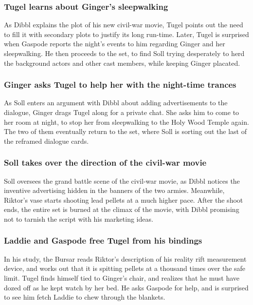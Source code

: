 \subsubsection{\Gls{Tugel} learns about \Gls{Ginger}'s sleepwalking}
As \Gls{Dibbl} explains the plot of his new civil-war movie, \Gls{Tugel} points out the need to
fill it with secondary plots to justify its long run-time. Later, \Gls{Tugel} is surprised when
\Gls{Gaspode} reports the night's events to him regarding \Gls{Ginger} and her sleepwalking. He
then proceeds to the set, to find \Gls{Soll} trying desperately to herd the background actors and
other cast members, while keeping \Gls{Ginger} placated.

\subsubsection{\Gls{Ginger} asks \Gls{Tugel} to help her with the night-time trances}
As \Gls{Soll} enters an argument with \Gls{Dibbl} about adding advertisements to the dialogue,
\Gls{Ginger} drags \Gls{Tugel} along for a private chat. She asks him to come to her room at night,
to stop her from sleepwalking to the Holy Wood Temple again. The two of them eventually return to
the set, where \Gls{Soll} is sorting out the last of the reframed dialogue cards.

\subsubsection{\Gls{Soll} takes over the direction of the civil-war movie}
\Gls{Soll} oversees the grand battle scene of the civil-war movie, as \Gls{Dibbl} notices the
inventive advertising hidden in the banners of the two armies. Meanwhile, \Gls{Riktor}'s vase starts
shooting lead pellets at a much higher pace. After the shoot ends, the entire set is burned at the
climax of the movie, with \Gls{Dibbl} promising not to tarnish the script with his marketing ideas.

\subsubsection{\Gls{Laddie} and \Gls{Gaspode} free \Gls{Tugel} from his bindings}
In his study, the \Gls{Bursar} reads \Gls{Riktor}'s description of his reality rift measurement
device, and works out that it is spitting pellets at a thousand times over the safe limit.
\Gls{Tugel} finds himself tied to \Gls{Ginger}'s chair, and realizes that he must have dozed off as
he kept watch by her bed. He asks \Gls{Gaspode} for help, and is surprised to see him fetch
\Gls{Laddie} to chew through the blankets.

